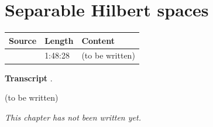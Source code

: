 \chapter{Separable Hilbert spaces}\label{ch:c23}
\begin{paracol}{2}

\begin{sources}
\begin{tabularx}{\linewidth}{@{}l l L@{}}
\toprule
\textbf{Source} & \textbf{Length} & \textbf{Content}\\
\midrule
{} & 1:48:28 & (to be written)\\
\bottomrule
\end{tabularx}

\smallskip
\textbf{Transcript} .
\end{sources}

\begin{reading}
(to be written)
\end{reading}

\emph{This chapter has not been written yet.}

\flushside
\end{paracol}
